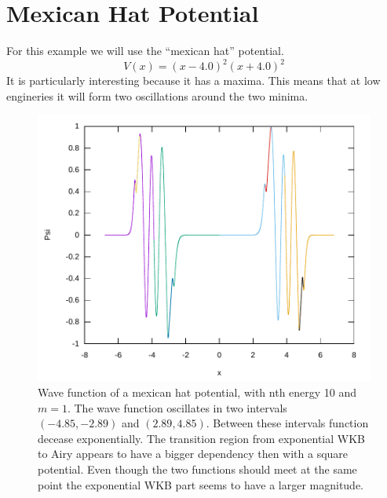 \documentclass[11pt,DIV=10,final]{scrreprt} %
\begin{document}
\section{Mexican Hat Potential}
For this example we will use the ``mexican hat'' potential.
\[
  V(x) = {(x - 4.0)}^{2} {(x + 4.0)}^{2}
\]
It is particularly interesting because it has a maxima. This means that at low engineries it will form two oscillations around the two minima.
\begin{figure}[H]
  \centering
  \includegraphics[width=\textwidth]{plots/mexican-hat-10.pdf}
  \caption{Wave function of a mexican hat potential, with nth energy 10 and $m = 1$. The wave function oscillates in two intervals $(-4.85, -2.89)$ and $(2.89, 4.85)$. Between these intervals
  function decease exponentially. The transition region from exponential WKB to Airy appears to have a bigger dependency then with a square potential. Even though the two functions should meet at the same point the exponential WKB part seems to have a larger magnitude.}
\end{figure}
\end{document}
